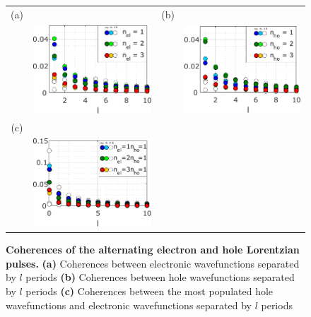 \begin{figure}[hptb]
	\begin{center}
		\begin{tabular}{c c c c}
			
			(a) & & (b) &  \\ 
			& \includegraphics[width = 5 cm]{./chap1/JnlAC_Data_leviton_40ps_1e_JMAP_f_vf_coh_el_el} &
			& \includegraphics[width = 5 cm]{./chap1/JnlAC_Data_leviton_40ps_1e_JMAP_f_vf_coh_ho_ho} \\
			(c) & & &  \\ 
			& \includegraphics[width = 5 cm]{./chap1/JnlAC_Data_leviton_40ps_1e_JMAP_f_vf_coh_el_ho_0} &
			& 
		\end{tabular} 
	\end{center}
	\caption{\textbf{Coherences of the alternating electron and hole Lorentzian pulses.} \textbf{(a)} Coherences between electronic wavefunctions separated by $l$ periods \textbf{(b)} Coherences between hole wavefunctions separated by $l$ periods \textbf{(c)} Coherences between the most populated hole wavefunctions and electronic wavefunctions separated by $l$ periods}
	\label{fig: coh du 1e 40ps AC}
\end{figure}

